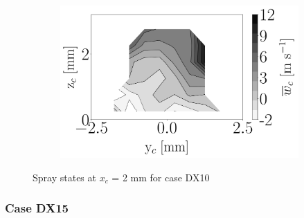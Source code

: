 \begin{figure}[h!]
\begin{subfigure}[b]{0.3\textwidth}
   \includegraphics[scale=\scaleSLIBIMER]{./part3_applications/figures_ch8_resolved/injectors_SLI/dx10_xD06p67_uz_mean_map}
\end{subfigure}
\caption{Spray states at $x_c$ = 2 mm for case DX10}
\label{fig:injectors_sli_BIMER_DX10_xD06p67}
\end{figure}


\clearpage

\subsubsection*{Case DX15}





